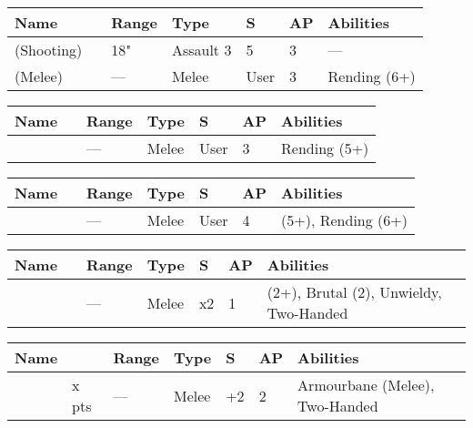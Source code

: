 
 \label{Melee Weapons}

 \label{Staff of Light}
	\noindent
	\begin{tabular}{||m{110pt} m{30pt} m{31pt} m{55pt} m{12pt} m{12pt} m{210pt}||}
		\hline
		Name & & Range & Type & S & AP & Abilities \\
		\hline
		\quickref{Staff of Light} (Shooting) & & 18" & Assault 3 & 5 & 3 & — \\
		\quickref{Staff of Light} (Melee) & & — & Melee & User & 3 & Rending (6+) \\
		\hline
\end{tabular}

 \label{Hyperphase Sword}
\noindent
\begin{tabular}{||m{110pt} m{30pt} m{31pt} m{55pt} m{12pt} m{12pt} m{210pt}||}
	\hline
	Name & & Range & Type & S & AP & Abilities \\
	\hline
	\quickref{Hyperphase Sword} &  & — & Melee & User & 3 & Rending (5+) \\
	\hline
\end{tabular}

 \label{Voidblade}
\noindent
\begin{tabular}{||m{110pt} m{30pt} m{31pt} m{55pt} m{12pt} m{12pt} m{210pt}||}
	\hline
	Name & & Range & Type & S & AP & Abilities \\
	\hline
	\quickref{Voidblade} &  & — & Melee & User & 4 & \quickref{Entropic Strike} (5+), Rending (6+) \\
	\hline
\end{tabular}

 \label{Voidscythe}
\noindent
\begin{tabular}{||m{110pt} m{30pt} m{31pt} m{55pt} m{12pt} m{12pt} m{210pt}||}
	\hline
	Name & & Range & Type & S & AP & Abilities \\
	\hline
	\quickref{Voidscythe} &  & — & Melee & x2 & 1 & \quickref{Entropic Strike} (2+), Brutal (2), Unwieldy, Two-Handed \\
	\hline
\end{tabular}

\label{Warscythe}
\noindent
\begin{tabular}{||m{110pt} m{30pt} m{31pt} m{55pt} m{12pt} m{12pt} m{210pt}||}
	\hline
	Name & & Range & Type & S & AP & Abilities \\
	\hline
	\quickref{Warscythe} & x pts& — & Melee & +2 & 2 & Armourbane (Melee), Two-Handed \\
	\hline
\end{tabular}



